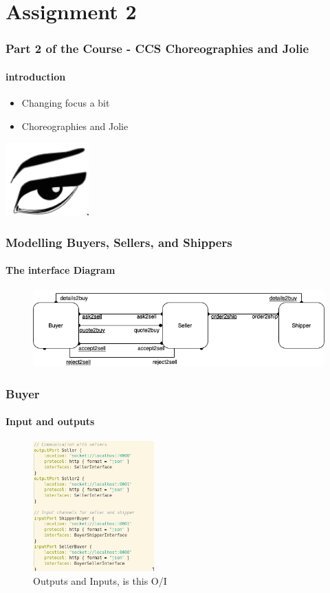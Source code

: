 \documentclass{beamer}
\begin{document}
    \section{Assignment 2}
    \begin{frame}[t]
        \frametitle{Part 2 of the Course - CCS Choreographies and Jolie}
        \framesubtitle{introduction}
        \begin{itemize}
            \item Changing focus a bit %
            \item Choreographies and Jolie
        \end{itemize}
        \includegraphics[width=0.2\linewidth]{images/jolielang.png}
    \end{frame}
    \begin{frame}[t]
        \frametitle{Modelling Buyers, Sellers, and Shippers}
        \framesubtitle{The interface Diagram}
        \begin{figure}
            \centering
            \includegraphics[width=0.8\linewidth]{images/InterfaceDiagram.png}
        \end{figure}
    \end{frame}
    \begin{frame}[t]
        \frametitle{Buyer}
        \framesubtitle{Input and outputs}
\begin{figure}[!h]
    \centering
    \includegraphics[height=5cm]{images2/buyerio.png}
    \caption{Outputs and Inputs, is this O/I}
    \label{fig:a2p1}
\end{figure}
    \end{frame}
\end{document}
